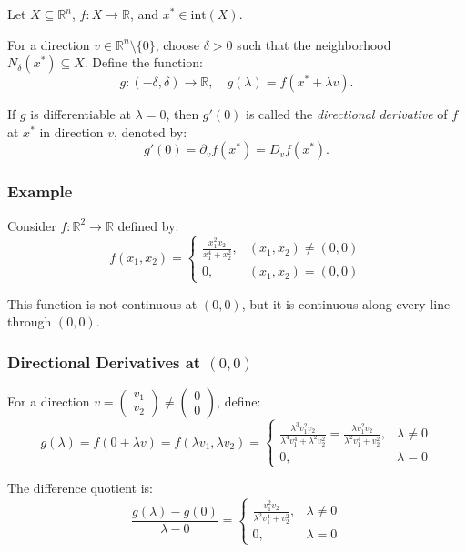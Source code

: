 \documentclass{article}
\begin{document}
Let \( X \subseteq \mathbb{R}^n \), \( f: X \rightarrow \mathbb{R} \), and \( x^* \in \text{int}(X) \). 

For a direction \( v \in \mathbb{R}^n \setminus \{0\} \), choose \( \delta > 0 \) such that the neighborhood \( N_\delta(x^*) \subseteq X \). Define the function:
\[ g: (-\delta, \delta) \rightarrow \mathbb{R}, \quad g(\lambda) = f(x^* + \lambda v). \]

If \( g \) is differentiable at \( \lambda = 0 \), then \( g'(0) \) is called the \textit{directional derivative} of \( f \) at \( x^* \) in direction \( v \), denoted by:
\[ g'(0) = \partial_v f(x^*) = D_v f(x^*). \]

\subsubsection*{Example}

Consider \( f: \mathbb{R}^2 \rightarrow \mathbb{R} \) defined by:
\[
f(x_1, x_2) = 
\begin{cases} 
\frac{x_1^2 x_2}{x_1^4 + x_2^2}, & (x_1, x_2) \neq (0, 0) \\ 
0, & (x_1, x_2) = (0, 0) 
\end{cases}
\]

This function is not continuous at \( (0, 0) \), but it is continuous along every line through \( (0, 0) \). 

\subsubsection*{Directional Derivatives at \( (0, 0) \)}

For a direction \( v = \begin{pmatrix} v_1 \\ v_2 \end{pmatrix} \neq \begin{pmatrix} 0 \\ 0 \end{pmatrix} \), define:
\[
g(\lambda) = f(0 + \lambda v) = f(\lambda v_1, \lambda v_2) = 
\begin{cases} 
\frac{\lambda^3 v_1^2 v_2}{\lambda^4 v_1^4 + \lambda^2 v_2^2} = \frac{\lambda v_1^2 v_2}{\lambda^2 v_1^4 + v_2^2}, & \lambda \neq 0 \\ 
0, & \lambda = 0 
\end{cases}
\]

The difference quotient is:
\[
\frac{g(\lambda) - g(0)}{\lambda - 0} = 
\begin{cases} 
\frac{v_1^2 v_2}{\lambda^2 v_1^4 + v_2^2}, & \lambda \neq 0 \\ 
0, & \lambda = 0 
\end{cases}
\]
\end{document}

